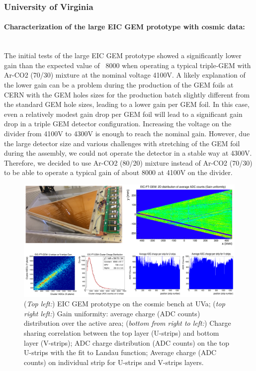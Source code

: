 \subsubsection{University of Virginia} 
\paragraph*{Characterization of the large EIC GEM prototype with cosmic data:}\mbox{}\\
The initial tests of the large EIC GEM prototype showed  a significantly lower gain than the expected value of ~8000 when operating a typical triple-GEM with  Ar-CO2 (70/30) mixture at the nominal voltage 4100V. A likely explanation of the lower gain can be a problem during the production of the GEM foils at CERN with  the GEM holes sizes for the production batch slightly different from the standard GEM hole sizes, leading to a lower gain per GEM foil. In this case, even a relatively modest gain drop per GEM foil will lead to a significant gain drop in a triple GEM detector configuration. Increasing the voltage on the divider from 4100V to 4300V is enough to reach the nominal gain. However, due the large detector size and various challenges with stretching of the GEM foil during the assembly, we could not operate the detector in a stable way at 4300V. Therefore, we decided to use Ar-CO2 (80/20) mixture instead of Ar-CO2 (70/30) to be able to operate a typical gain of about 8000  at 4100V on the divider.\\
% 
\begin{figure}[htb]
\centering
\includegraphics[width=1\columnwidth,trim={0pt 0mm 0pt 0mm},clip]{UVa_plots/eicCosmic}
\caption{\label{fig:eicCosmic}({\it Top left:}) EIC GEM prototype on the cosmic bench at UVa;  ({\it top right left:}) Gain uniformity: average charge (ADC counts) distribution over the active area; ({\it bottom from right to left:}) Charge sharing correlation between the top layer (U-strips) and bottom layer (V-strips); ADC charge distribution (ADC counts) on the top U-strips with the fit to Landau function;  Average charge (ADC counts) on  individual strip for U-strips and V-strips layers.}
\end{figure}
